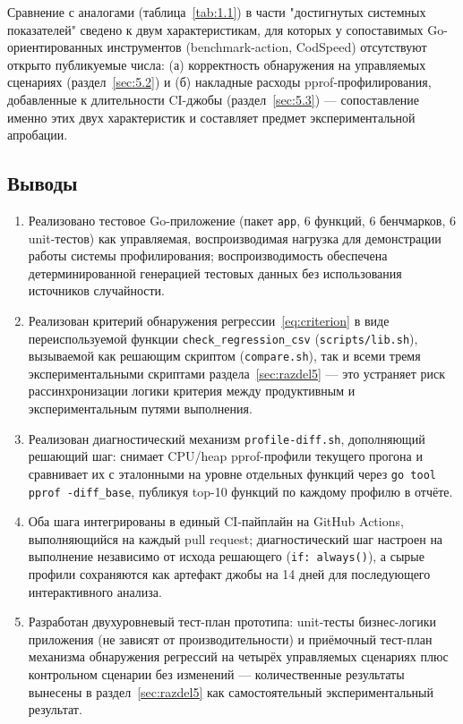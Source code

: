 \documentclass[12pt,a4paper]{article}
\numberwithin{equation}{section}
\begin{document}
Сравнение с аналогами (таблица~\ref{tab:1.1}) в части "достигнутых
системных показателей" сведено к двум характеристикам, для которых
у сопоставимых Go-ориентированных инструментов (benchmark-action,
CodSpeed) отсутствуют открыто публикуемые числа: (а) корректность
обнаружения на управляемых сценариях (раздел~\ref{sec:5.2}) и
(б) накладные расходы pprof-профилирования, добавленные к длительности
CI-джобы (раздел~\ref{sec:5.3}) — сопоставление именно этих двух
характеристик и составляет предмет экспериментальной апробации.

\subsection{Выводы}

\begin{enumerate}
\item Реализовано тестовое Go-приложение (пакет \texttt{app}, 6 функций,
6 бенчмарков, 6 unit-тестов) как управляемая, воспроизводимая нагрузка для
демонстрации работы системы профилирования; воспроизводимость обеспечена
детерминированной генерацией тестовых данных без использования
источников случайности.
\item Реализован критерий обнаружения регрессии~\eqref{eq:criterion} в виде
переиспользуемой функции \texttt{check\_regression\_csv}
(\texttt{scripts/\allowbreak lib.sh}), вызываемой как решающим скриптом
(\texttt{compare.sh}), так и всеми тремя экспериментальными скриптами
раздела~\ref{sec:razdel5} — это устраняет риск рассинхронизации логики
критерия между продуктивным и экспериментальным путями выполнения.
\item Реализован диагностический механизм \texttt{profile-diff.sh},
дополняющий решающий шаг: снимает CPU/heap pprof-профили текущего прогона
и сравнивает их с эталонными на уровне отдельных функций через
\texttt{go tool pprof -diff\_base}, публикуя top-10 функций по каждому
профилю в отчёте.
\item Оба шага интегрированы в единый CI-пайплайн на GitHub Actions,
выполняющийся на каждый pull request; диагностический шаг настроен на
выполнение независимо от исхода решающего (\texttt{if: always()}), а сырые
профили сохраняются как артефакт джобы на 14 дней для последующего
интерактивного анализа.
\item Разработан двухуровневый тест-план прототипа: unit-тесты бизнес-логики
приложения (не зависят от производительности) и приёмочный тест-план
механизма обнаружения регрессий на четырёх управляемых сценариях плюс
контрольном сценарии без изменений — количественные результаты вынесены
в раздел~\ref{sec:razdel5} как самостоятельный экспериментальный результат.
\end{enumerate}
\end{document}

